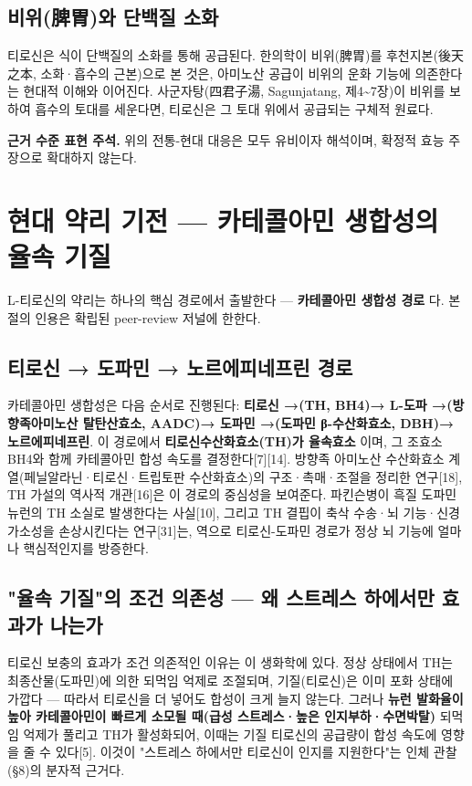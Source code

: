 \documentclass[11pt,oneside]{book}
\newenvironment{authnote}
  {\par\smallskip\begingroup\leftskip=7mm\rightskip=5mm\small\color{muted}\noindent\ignorespaces}
  {\par\endgroup\smallskip}
\begin{document}
\subsection{비위(脾胃)와 단백질 소화}
티로신은 식이 단백질의 소화를 통해 공급된다. 한의학이 비위(脾胃)를 후천지본(後天之本, 소화·흡수의 근본)으로 본 것은, 아미노산 공급이 비위의 운화 기능에 의존한다는 현대적 이해와 이어진다. 사군자탕(四君子湯, Sagunjatang, 제4\textasciitilde{}7장)이 비위를 보하여 흡수의 토대를 세운다면, 티로신은 그 토대 위에서 공급되는 구체적 원료다.

\begin{authnote}\textbf{근거 수준 표현 주석.} 위의 전통-현대 대응은 모두 유비이자 해석이며, 확정적 효능 주장으로 확대하지 않는다.\end{authnote}
\section{현대 약리 기전 — 카테콜아민 생합성의 율속 기질}
L-티로신의 약리는 하나의 핵심 경로에서 출발한다 — \textbf{카테콜아민 생합성 경로} 다. 본 절의 인용은 확립된 peer-review 저널에 한한다.

\subsection{티로신 → 도파민 → 노르에피네프린 경로}
카테콜아민 생합성은 다음 순서로 진행된다: \textbf{티로신 →(TH, BH4)→ L-도파 →(방향족아미노산 탈탄산효소, AADC)→ 도파민 →(도파민 β-수산화효소, DBH)→ 노르에피네프린}. 이 경로에서 \textbf{티로신수산화효소(TH)가 율속효소} 이며, 그 조효소 BH4와 함께 카테콜아민 합성 속도를 결정한다[7][14]. 방향족 아미노산 수산화효소 계열(페닐알라닌·티로신·트립토판 수산화효소)의 구조·촉매·조절을 정리한 연구[18], TH 가설의 역사적 개관[16]은 이 경로의 중심성을 보여준다. 파킨슨병이 흑질 도파민 뉴런의 TH 소실로 발생한다는 사실[10], 그리고 TH 결핍이 축삭 수송·뇌 기능·신경 가소성을 손상시킨다는 연구[31]는, 역으로 티로신-도파민 경로가 정상 뇌 기능에 얼마나 핵심적인지를 방증한다.

\subsection{"율속 기질"의 조건 의존성 — 왜 스트레스 하에서만 효과가 나는가}
티로신 보충의 효과가 조건 의존적인 이유는 이 생화학에 있다. 정상 상태에서 TH는 최종산물(도파민)에 의한 되먹임 억제로 조절되며, 기질(티로신)은 이미 포화 상태에 가깝다 — 따라서 티로신을 더 넣어도 합성이 크게 늘지 않는다. 그러나 \textbf{뉴런 발화율이 높아 카테콜아민이 빠르게 소모될 때(급성 스트레스·높은 인지부하·수면박탈)} 되먹임 억제가 풀리고 TH가 활성화되어, 이때는 기질 티로신의 공급량이 합성 속도에 영향을 줄 수 있다[5]. 이것이 "스트레스 하에서만 티로신이 인지를 지원한다"는 인체 관찰(§8)의 분자적 근거다.
\end{document}
